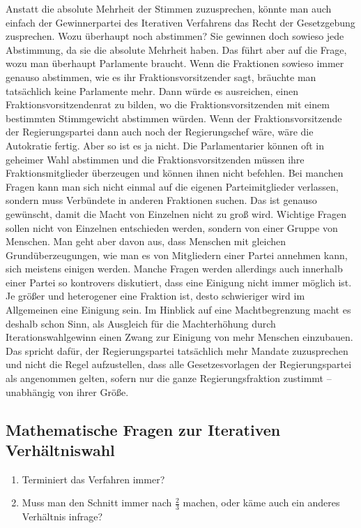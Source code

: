 Anstatt die absolute Mehrheit der Stimmen zuzusprechen, könnte man auch einfach der
Gewinnerpartei des Iterativen Verfahrens das Recht der Gesetzgebung zusprechen. Wozu überhaupt
noch abstimmen? Sie gewinnen doch sowieso jede Abstimmung, da sie die absolute Mehrheit haben.
Das führt aber auf die Frage, wozu man überhaupt Parlamente braucht. Wenn die Fraktionen sowieso
immer genauso abstimmen, wie es ihr Fraktionsvorsitzender sagt, bräuchte man tatsächlich keine
Parlamente mehr. Dann würde es ausreichen, einen Fraktionsvorsitzendenrat zu bilden, wo die
Fraktionsvorsitzenden mit einem bestimmten Stimmgewicht abstimmen würden. Wenn der
Fraktionsvorsitzende der Regierungspartei dann auch noch der Regierungschef wäre, wäre die
Autokratie fertig.
Aber so ist es ja nicht. Die Parlamentarier können oft in geheimer Wahl abstimmen und die
Fraktionsvorsitzenden müssen ihre Fraktionsmitglieder überzeugen und können ihnen nicht
befehlen. Bei manchen Fragen kann man sich nicht einmal auf die eigenen Parteimitglieder
verlassen, sondern muss Verbündete in anderen Fraktionen suchen. Das ist genauso gewünscht,
damit die Macht von Einzelnen nicht zu groß wird. Wichtige Fragen sollen nicht von Einzelnen
entschieden werden, sondern von einer Gruppe von Menschen. Man geht aber davon aus, dass Menschen
mit gleichen Grundüberzeugungen, wie man es von Mitgliedern einer Partei annehmen kann, sich
meistens einigen werden. Manche Fragen werden allerdings auch innerhalb einer Partei so
kontrovers diskutiert, dass eine Einigung nicht immer möglich ist. Je größer und heterogener eine
Fraktion ist, desto schwieriger wird im Allgemeinen eine Einigung sein. Im Hinblick auf eine
Machtbegrenzung macht es deshalb schon Sinn, als Ausgleich für die Machterhöhung durch
Iterationswahlgewinn einen Zwang zur Einigung von mehr Menschen einzubauen. Das spricht dafür,
der Regierungspartei tatsächlich mehr Mandate zuzusprechen und nicht die Regel aufzustellen, dass
alle Gesetzesvorlagen der Regierungspartei als angenommen gelten, sofern nur die ganze
Regierungsfraktion zustimmt -- unabhängig von ihrer Größe.

\subsection{Mathematische Fragen zur Iterativen Verhältniswahl}

\begin{enumerate}
  \item Terminiert das Verfahren immer?
  \item Muss man den Schnitt immer nach $\tfrac{2}{3}$ machen, oder käme auch ein anderes
    Verhältnis infrage?
\end{enumerate}

